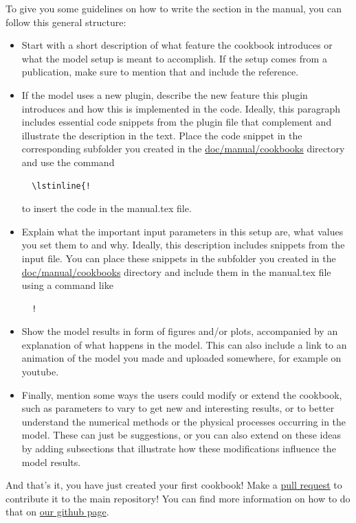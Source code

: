 \documentclass{article}
\begin{document}
To give you some guidelines on how to write the section in the manual, you can follow this general structure:
\begin{itemize}
\item Start with a short description of what feature the cookbook introduces or what
  the model setup is meant to accomplish. If the setup comes from a publication, make sure
  to mention that and include the reference.
\item If the model uses a new plugin, describe the new feature this plugin introduces
  and how this is implemented in the code. Ideally, this paragraph includes essential code
  snippets from the plugin file that complement and illustrate the description in the text.
  Place the code snippet in the corresponding subfolder you created in the
  \href{doc/manual/cookbooks/.}{doc/manual/cookbooks} directory and
  use the command 
  \begin{verbatim}
  \lstinline{!
  \end{verbatim}
  to insert the code in the manual.tex file.
\item Explain what the important input parameters in this setup are, what values you
  set them to and why. Ideally, this description includes snippets from
  the input file. You can place these snippets in the subfolder you created in the
  \href{doc/manual/cookbooks/.}{doc/manual/cookbooks}
  directory and include them in the manual.tex file using a command like
  \begin{verbatim}
  !
  \end{verbatim}
\item Show the model results in form of figures and/or plots, accompanied by an explanation
  of what happens in the model. This can also include a link to an animation of the model
  you made and uploaded somewhere, for example on youtube.
\item Finally, mention some ways the users could modify or extend the cookbook, such as
  parameters to vary to get new and interesting results, or to better understand
  the numerical methods or the physical processes occurring in the model. These can just be
  suggestions, or you can also extend on these ideas by adding subsections that illustrate
  how these modifications influence the model results.
\end{itemize}

And that's it, you have just created your first cookbook! Make a
\href{https://guides.github.com/introduction/flow/}{pull request} to contribute it to the
main repository! You can find more information on how to do that on 
\href{https://github.com/geodynamics/aspect/blob/master/CONTRIBUTING.md}{our github page}. 
\end{document}

